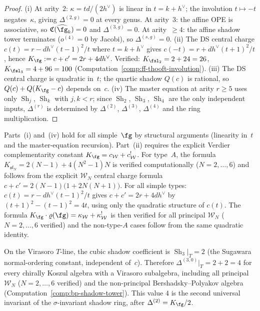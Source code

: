 \begin{proof}
(i) At arity~$2$: $\kappa = td/(2h^\vee)$ is linear in
$t = k + h^\vee$; the involution $t \mapsto -t$ negates~$\kappa$,
giving $\Delta^{(2,g)} = 0$ at every genus.
At arity~$3$: the affine OPE is associative, so
$\mathfrak{C}(\widehat{\fg}_k) = 0$ and $\Delta^{(3,g)} = 0$.
At arity~$\geq 4$: the affine shadow tower terminates
($o^{(4)} = 0$ by Jacobi), so $\Delta^{(s,g)} = 0$.
(ii) The DS central charge $c(t) = r - dh^\vee(t{-}1)^2/t$
where $t = k + h^\vee$ gives
$c(-t) = r + dh^\vee(t{+}1)^2/t$, hence
$K_\fg := c + c' = 2r + 4dh^\vee$.
Verified: $K_{\fsl_2} = 2 + 24 = 26$,
$K_{\fsl_3} = 4 + 96 = 100$
(Computation~\ref{comp:ff-thooft-involution}).
(iii) The DS central charge is quadratic in~$t$;
the quartic shadow $Q(c)$ is rational, so
$Q(c) + Q(K_\fg - c)$ depends on~$c$.
(iv) The master equation at arity $r \geq 5$ uses only
$\operatorname{Sh}_j$, $\operatorname{Sh}_k$ with $j,k < r$;
since $\operatorname{Sh}_2$, $\operatorname{Sh}_3$,
$\operatorname{Sh}_4$ are the only independent inputs,
$\Delta^{(r)}$ is determined by
$\Delta^{(2)}$, $\Delta^{(3)}$, $\Delta^{(4)}$
and the ring multiplication.
\end{proof}

\begin{remark}\label{rem:ds-tower-non-a}%
Parts~(i) and~(iv) hold for all simple~$\fg$ by structural
arguments (linearity in~$t$ and the master-equation recursion).
Part~(ii) requires the explicit Verdier complementarity constant
$K_\fg = c_{\mathcal{W}} + c_{\mathcal{W}}^!$.  For type~$A$, the formula
$K_{\mathfrak{sl}_N} = 2(N\!-\!1) + 4(N^2\!-\!1)N$
is verified computationally ($N = 2,\ldots,6$) and follows from
the explicit $\mathcal{W}_N$ central charge formula
$c + c' = 2(N\!-\!1)\bigl(1 + 2N(N\!+\!1)\bigr)$.
For all simple types: $c(t) = r - dh^\vee(t{-}1)^2/t$ gives
$c + c' = 2r + 4dh^\vee$ by
$(t{+}1)^2 - (t{-}1)^2 = 4t$,
using only the quadratic structure of $c(t)$.
The formula $K_\fg\cdot\varrho(\fg) = \kappa_{\mathcal{W}} + \kappa_{\mathcal{W}}^!$
is then verified for all principal $\mathcal{W}_N$ ($N = 2, \ldots, 6$ verified) and the
non-type-$A$ cases follow from the same quadratic identity.
\end{remark}

\begin{remark}
\label{rem:delta3-universality}
On the Virasoro $T$-line, the cubic shadow coefficient is
$\operatorname{Sh}_3\big|_T = 2$ (the Sugawara normal-ordering
constant, independent of~$c$).
Therefore $\Delta^{(3,0)}\big|_T = 2 + 2 = 4$ for every
chirally Koszul algebra with a Virasoro subalgebra, including
all principal $\mathcal{W}_N$ ($N = 2, \ldots, 6$ verified) and the
non-principal Bershadsky--Polyakov algebra
(Computation~\ref{comp:bp-shadow-tower}).
This value $4$ is the second universal invariant of the
$\sigma$-invariant shadow ring, after
$\Delta^{(2)} = K_\fg / 2$.
\end{remark}

